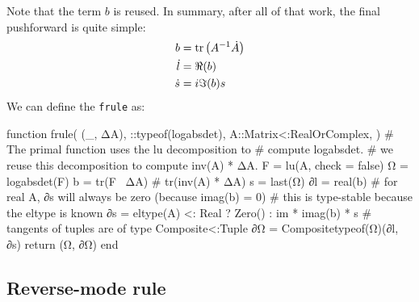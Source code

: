 \documentclass[../main.tex]{subfiles}
\begin{document}
\begin{refsection}
Note that the term $b$ is reused.
In summary, after all of that work, the final pushforward is quite simple:
\begin{align}
b &= \operatorname{tr} \left( A^{-1} \dot{A} \right) \label{logabsdet_b} \\
\dot{l} &= \Re(b) \label{logabsdet_ldot}\\
\dot{s} &= i \Im(b) s \label{logabsdet_sdot}\\
\end{align}
We can define the \texttt{frule} as:
\begin{juliacode}
function frule(
    (_, ΔA),
    ::typeof(logabsdet),
    A::Matrix{<:RealOrComplex},
)
    # The primal function uses the lu decomposition to
    # compute logabsdet.
    # we reuse this decomposition to compute inv(A) * ΔA.
    F = lu(A, check = false)
    Ω = logabsdet(F)
    b = tr(F \ ΔA) # tr(inv(A) * ΔA)
    s = last(Ω)
    ∂l = real(b)
    # for real A, ∂s will always be zero (because imag(b) = 0)
    # this is type-stable because the eltype is known
    ∂s = eltype(A) <: Real ? Zero() : im * imag(b) * s
    # tangents of tuples are of type Composite{<:Tuple}
    ∂Ω = Composite{typeof(Ω)}(∂l, ∂s)
    return (Ω, ∂Ω)
end
\end{juliacode}
\subsection{Reverse-mode rule}\label{reverse-mode-rule}


\end{refsection}
\end{document}
